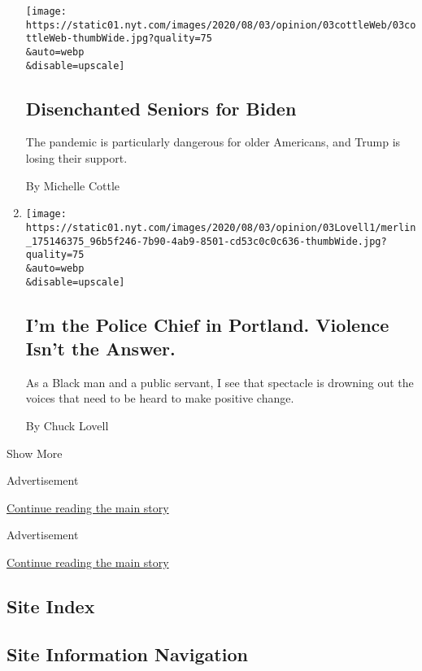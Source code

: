 \begin{enumerate}
  \texttt{[image: https://static01.nyt.com/images/2020/08/03/opinion/03cottleWeb/03cottleWeb-thumbWide.jpg?quality=75\\\&auto=webp\\\&disable=upscale]}

  \hypertarget{disenchanted-seniors-for-biden}{%
  \subsection{Disenchanted Seniors for
  Biden}\label{disenchanted-seniors-for-biden}}

  The pandemic is particularly dangerous for older Americans, and Trump
  is losing their support.

  By Michelle Cottle
\item
  \href{/2020/08/03/opinion/portland-protests-police-chief.html}{}

  \texttt{[image: https://static01.nyt.com/images/2020/08/03/opinion/03Lovell1/merlin\_175146375\_96b5f246-7b90-4ab9-8501-cd53c0c0c636-thumbWide.jpg?quality=75\\\&auto=webp\\\&disable=upscale]}

  \hypertarget{im-the-police-chief-in-portland-violence-isnt-the-answer}{%
  \subsection{I'm the Police Chief in Portland. Violence Isn't the
  Answer.}\label{im-the-police-chief-in-portland-violence-isnt-the-answer}}

  As a Black man and a public servant, I see that spectacle is drowning
  out the voices that need to be heard to make positive change.

  By Chuck Lovell
\end{enumerate}

Show More

Advertisement

\protect\hyperlink{after-mid1}{Continue reading the main story}

Advertisement

\protect\hyperlink{after-mktg}{Continue reading the main story}

\hypertarget{site-index}{%
\subsection{Site Index}\label{site-index}}

\hypertarget{site-information-navigation}{%
\subsection{Site Information
Navigation}\label{site-information-navigation}}

